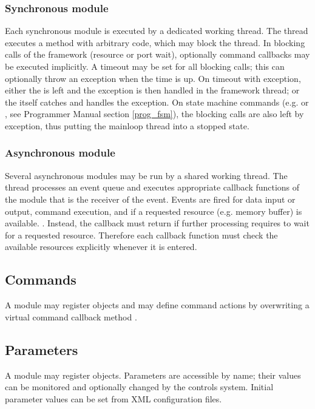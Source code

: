 \subsubsection{Synchronous module} 
Each synchronous module is executed by a 
dedicated working thread. The thread executes a
 method  with arbitrary code, which may block 
the thread. In blocking calls of the framework (resource or 
port wait), optionally command callbacks may be executed 
implicitly.
A timeout may be set for all blocking calls; this can 
optionally throw an exception when the time is up. On timeout 
with exception, either the  is left and the exception 
is then handled in the framework thread; or the  itself 
catches and handles the exception. On state machine commands (e.g. 
 or , see Programmer Manual section \ref{prog_fsm}), 
the blocking calls are also left by exception, 
thus putting the mainloop thread into a stopped state.

\subsubsection{Asynchronous module}
 Several asynchronous modules may be run by a shared working thread. 
The thread processes an event queue and executes 
appropriate callback functions 
of the module that is the receiver of the event. Events are fired for data input 
or output, command execution, and if a requested resource (e.g. memory buffer) 
is available. . 
Instead, the callback must return if further processing requires 
to wait for a requested resource. Therefore each callback function must check the 
available resources explicitly whenever it is entered.
           
\subsection{Commands}
A module may register  objects and may define 
command actions by overwriting a virtual command callback method .

\subsection{Parameters}
A module may register   objects. 
Parameters are accessible by name; their values can be monitored and optionally changed by 
the controls system. Initial parameter values can be set from XML configuration files.   

